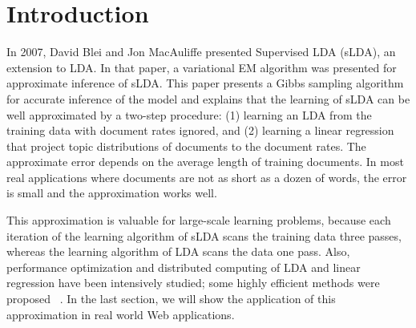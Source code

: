 
\section{Introduction}

In 2007, David Blei and Jon MacAuliffe presented Supervised LDA
(sLDA)\cite{slda}, an extension to LDA\cite{lda_vem}.  In that paper,
a variational EM algorithm was presented for approximate inference of
sLDA.  This paper presents a Gibbs sampling algorithm for accurate
inference of the model and explains that the learning of sLDA can be
well approximated by a two-step procedure: (1) learning an LDA from
the training data with document rates ignored, and (2) learning a
linear regression that project topic distributions of documents to the
document rates.  The approximate error depends on the average length
of training documents.  In most real applications where documents are
not as short as a dozen of words, the error is small and the
approximation works well.

This approximation is valuable for large-scale learning problems,
because each iteration of the learning algorithm of sLDA scans the
training data three passes, whereas the learning algorithm of LDA
scans the data one pass.  Also, performance optimization and
distributed computing of LDA and linear regression have been
intensively studied; some highly efficient methods were
proposed~\cite{dist-lda-gibbs} \cite{async-dist-lda-gibbs}
\cite{fastlda}.  In the last section, we will show the application of
this approximation in real world Web applications.



